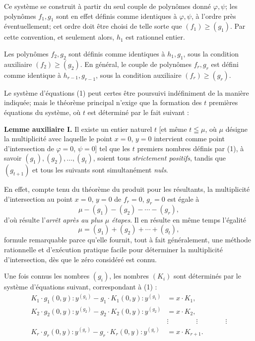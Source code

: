Ce système se construit à partir du seul couple de polynômes donné $\varphi,\psi$; les polynômes $f_1,g_1$ sont en effet définis comme identiques à $\varphi,\psi$, à l'ordre près éventuellement; cet ordre doit être choisi de telle sorte que $(f_1)\geq(g_1)$. Par cette convention, et seulement alors, $h_1$ est rationnel entier.

Les polynômes $f_2,g_2$ sont définis comme identiques à $h_1,g_1$, sous la condition auxiliaire $(f_2)\geq(g_2)$. En général, le couple de polynômes $f_r,g_r$ est défini comme identique à $h_{r-1},g_{r-1}$, sous la condition auxiliaire $(f_r)\geq(g_r)$.

Le système d'équations (1) peut certes être poursuivi indéfiniment de la manière indiquée; mais le théorème principal n'exige que la formation des $t$ premières équations du système, où $t$ est déterminé par le fait suivant :

\textbf{Lemme auxiliaire I.} Il existe un entier naturel $t$ [et même $t\leqq\mu$, où $\mu$ désigne la multiplicité avec laquelle le point $x=0$, $y=0$ intervient comme point d'intersection de $\varphi=0$, $\psi=0$] tel que les $t$ premiers nombres définis par (1), à savoir $(g_1),(g_2),\ldots,(g_t)$, soient tous \emph{strictement positifs}, tandis que $(g_{t+1})$ et tous les suivants sont simultanément \emph{nuls}.

En effet, compte tenu du théorème du produit pour les résultants, la multiplicité d'intersection au point $x=0$, $y=0$ de $f_r=0$, $g_r=0$ est égale à
\[
\mu-(g_1)-(g_2)-\cdots-(g_r),
\]
d'où résulte l'\emph{arrêt après au plus $\mu$ étapes}. Il en résulte en même temps l'égalité
\begin{equation}
\tag{2}
\mu=(g_1)+(g_2)+\cdots+(g_t),
\end{equation}
formule remarquable parce qu'elle fournit, tout à fait généralement, une méthode rationnelle et d'exécution pratique facile pour déterminer la multiplicité d'intersection, dès que le zéro considéré est connu.

Une fois connus les nombres $(g_i)$, les nombres $(K_i)$ sont déterminés par le système d'équations suivant, correspondant à (1) :
\begin{equation}
\tag{3}
\begin{aligned}
K_1\cdot g_1(0,y):y^{(g_1)}-g_1\cdot K_1(0,y):y^{(g_1)}&=x\cdot K_1,\\
K_2\cdot g_2(0,y):y^{(g_2)}-g_2\cdot K_2(0,y):y^{(g_2)}&=x\cdot K_2,\\
&\vdots\qquad\qquad\vdots\qquad\qquad\vdots\\
K_r\cdot g_r(0,y):y^{(g_r)}-g_r\cdot K_r(0,y):y^{(g_r)}&=x\cdot K_{r+1}.
\end{aligned}
\end{equation}

